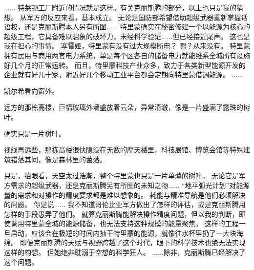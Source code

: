 \documentclass[openany]{book}
\begin{document}
\begin{dialogue}
     ......
     特莱顿工厂附近的情况就是这样。有关克丽斯腾的部分，以上也只是我的猜想。
     从军方的反应来看，基本成立。
     无论是国防部希望借助超级武器重新掌握话语权，还是克丽斯腾本人另有所图......
     特里蒙确实在秘密修建一个以能源为核心的超级工程，它具备难以想象的破坏力，未经科学验证......但已经接近尾声。
     这也是我在担心的事情。
     塞雷娅，特里蒙有没有过大规模断电？
     嗯？从来没有。
     特里蒙拥有民用与商用两套电力系统，单是每个区各自的储备电力就能维系全城所有设施好几个月的正常运转。
     而且，特里蒙科技产业众多，致力于各类新型能源开发的企业就有好几十家，附近好几个移动工业平台都会定期向特里蒙借调能源。
     ......\par
    凯尔希看向窗外。\par
    远方的那栋高楼，巨幅玻璃外墙盛放着云朵，异常清澈，像是一片盛满了露珠的树叶。\par
    确实只是一片树叶。\par
    视线再远些，那栋高楼很快隐没在无数的摩天楼里，科技展馆、博览会馆等特殊建筑错落其间，像是森林里的菌落。\par
    只是，抬眼看，天空太过浩瀚，整个特里蒙也只是一片单薄的树叶。
     无论它是军方需求的超级武器，还是克丽斯腾另有所图的未知之物......
     “地平弧光计划”对能源量的需求和对操作的精度要求都是难以想象的。
     耗能与精准导航是他们必须解决的问题。
     你是说......
     我不知道哥伦比亚军方做出了怎样的评估，或是克丽斯腾用怎样的手段愚弄了他们。
     就算克丽斯腾能解决操作精度问题，但以我的判断，即使调用特里蒙全城的能源储备，也无法支持这种规模的能量聚焦。
     这样的工程一旦启动，应该会在极短的时间内抽干特里蒙的能源，就像往水杯里扔了一大块海绵。
     即便克丽斯腾的天赋与视野跨越了这个时代，眼下的科学技术也绝无法实现这样的构想。
     但她绝非耽溺于空想的科学狂人。
     ......除非，克丽斯腾已经解决了这个问题。
\end{dialogue}
\end{document}
